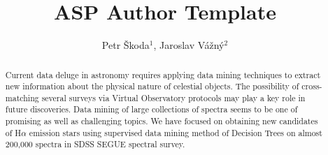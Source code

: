 \documentclass[11pt,twoside]{article}
\begin{document}


\title{ASP Author Template}
\author{Petr \v{S}koda$^1$, Jaroslav V\'{a}\v{z}n\'{y}$^2$
}

\begin{abstract}Current data deluge in
astronomy requires applying data mining techniques to extract new
information about the physical nature of celestial objects. The
possibility of cross-matching several surveys via Virtual Observatory
protocols may play a key role in future discoveries. Data mining of
large collections of spectra seems to be one of promising as well as
challenging topics.  We have focused on obtaining new candidates of
H$\alpha$ emission stars using supervised data mining method of
Decision Trees on almost 200,000 spectra in SDSS SEGUE spectral
survey.
\end{abstract}
\end{document}
